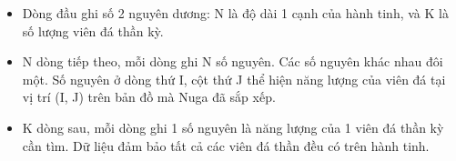 \begin{itemize}
	\item     Dòng đầu ghi số 2 nguyên dương: N là độ dài 1 cạnh của hành tinh, và K là số lượng viên đá thần kỳ.   
	\item     N dòng tiếp theo, mỗi dòng ghi N số nguyên. Các số nguyên khác nhau đôi một. Số nguyên ở dòng thứ I, cột thứ J thể hiện năng lượng của viên đá tại vị trí (I, J) trên bản đồ mà Nuga đã sắp xếp.   
	\item     K dòng sau, mỗi dòng ghi 1 số nguyên là năng lượng của 1 viên đá thần kỳ cần tìm. Dữ liệu đảm bảo tất cả các viên đá thần đều có trên hành tinh.   
\end{itemize}